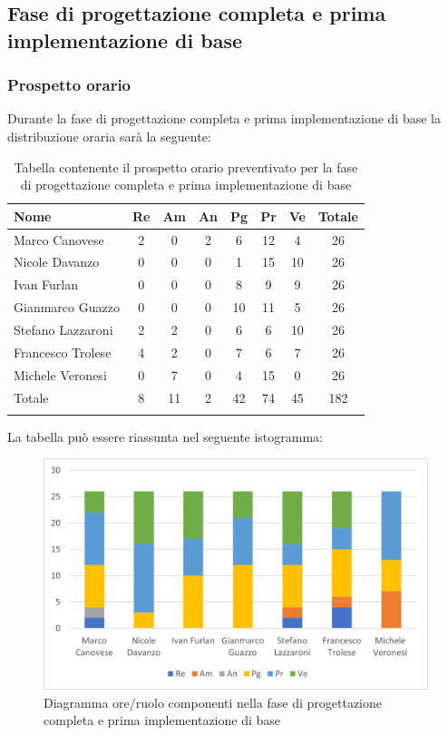 			\subsection{Fase di progettazione completa e prima implementazione di base}
            \subsubsection{Prospetto orario}
			Durante la fase di progettazione completa e prima implementazione di base la distribuzione oraria sarà la seguente:
			
			\begin{longtable}{|l|c|c|c|c|c|c|c|}
				\hline
				\rowcolor{lighter-grayer}
				\textbf{Nome} & \textbf{Re} & \textbf{Am} & \textbf{An} & \textbf{Pg}  & \textbf{Pr}   & \textbf{Ve} & \textbf{Totale} \\
				\hline
				\endfirsthead
				
				\hline
				Marco Canovese & 2 & 0 & 2 & 6 & 12 & 4 & 26\\
				\hline
				\hline
				Nicole Davanzo & 0 & 0 & 0 & 1 & 15 & 10 & 26\\
				\hline
				\hline
				Ivan Furlan & 0 & 0 & 0 & 8 & 9 & 9 & 26\\
				\hline
				\hline
				Gianmarco Guazzo & 0 & 0 & 0 & 10 & 11 & 5 & 26\\
				\hline
				\hline
				Stefano Lazzaroni & 2 & 2 & 0 & 6 & 6 & 10 & 26\\
				\hline
				\hline
				Francesco Trolese & 4 & 2 & 0 & 7 & 6 & 7 & 26\\
				\hline
				\hline
				Michele Veronesi & 0 & 7 & 0 & 4 & 15 & 0 & 26\\
				\hline 
				\hline
				Totale & 8 & 11 & 2 & 42 & 74 & 45 & 182\\
				\hline 
				\rowcolor{white}
				\caption{Tabella contenente il prospetto orario preventivato per la fase di progettazione completa e prima implementazione di base}
			\end{longtable}

		
			La tabella può essere riassunta nel seguente istogramma:
		
			\begin{figure}[H]
				\centering
				\includegraphics[width=0.8\linewidth]{res/images/preventivo/5-1.png}
				\caption{Diagramma ore/ruolo componenti nella fase di progettazione completa e prima implementazione di base}
				\label{fig:diagramma suddivisione ruoli fase progettazione completa e prima implementazione di base}
			\end{figure}
		
